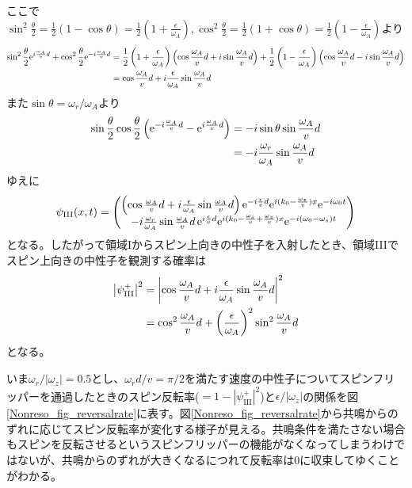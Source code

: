 ここで$\sin^2 \frac{\theta}{2}=\frac{1}{2}(1-\cos \theta) =\frac{1}{2} (1+\frac{\epsilon}{\omega_A}),\cos^2\frac{\theta}{2}=\frac{1}{2} (1+\cos\theta) =\frac{1}{2} (1-\frac{\epsilon}{\omega_A})$より
\begin{align}
\sin^2 \frac{\theta}{2} \mathrm{e}^{i\frac{\omega_A}{v}d} +\cos^2 \frac{\theta}{2} \mathrm{e}^{-i\frac{\omega_A}{v}d} &= \frac{1}{2} \left(1+\frac{\epsilon}{\omega_A}\right) \left(\cos \frac{\omega_A}{v}d+i\sin \frac{\omega_A}{v}d \right)+\frac{1}{2} \left(1-\frac{\epsilon}{\omega_A}\right) \left(\cos \frac{\omega_A}{v}d-i\sin \frac{\omega_A}{v}d \right) \notag \\
&=\cos \frac{\omega_A}{v}d +i\frac{\epsilon}{\omega_A} \sin \frac{\omega_A}{v}d
\end{align}
また$\sin\theta=\omega_r/\omega_A$より
\begin{align}
\sin\frac{\theta}{2}\cos\frac{\theta}{2} \left(\mathrm{e}^{-i\frac{\omega_A}{v}d}-\mathrm{e}^{i\frac{\omega_A}{v}d}\right) &=-i \sin \theta \sin \frac{\omega_A}{v}d \notag \\
&= -i \frac{\omega_r}{\omega_A} \sin \frac{\omega_A}{v}d
\end{align}
ゆえに
\begin{align}
\psi_\mathrm{III}(x,t)=\begin{pmatrix} \left(\cos \frac{\omega_A}{v}d +i\frac{\epsilon}{\omega_A} \sin \frac{\omega_A}{v}d\right) \mathrm{e}^{-i\frac{\epsilon}{v} d} \mathrm{e}^{i(k_0-\frac{\omega_z}{v})x}\mathrm{e}^{-i\omega_0t} \\ -i \frac{\omega_r}{\omega_A} \sin \frac{\omega_A}{v}d  \, \mathrm{e}^{i\frac{\epsilon}{v}d} \mathrm{e}^{i(k_0-\frac{\omega_s}{v}+\frac{\omega_z}{v})x}\mathrm{e}^{-i(\omega_0-\omega_s)t} \end{pmatrix}
\end{align}
となる。したがって領域Iからスピン上向きの中性子を入射したとき、領域IIIでスピン上向きの中性子を観測する確率は
\begin{align}
\bigl|\psi_\mathrm{III}^+\bigr|^2 &=\biggl |\cos \frac{\omega_A}{v}d +i\frac{\epsilon}{\omega_A} \sin \frac{\omega_A}{v}d\biggr|^2 \notag \\
&=\cos^2 \frac{\omega_A}{v}d+\left(\frac{\epsilon}{\omega_A}\right)^2\sin^2\frac{\omega_A}{v}d
\end{align} \label{Nonreso_1-reversal}
となる。

いま$\omega_r/|\omega_z|=0.5$とし、$\omega_r d/v=\pi/2$を満たす速度の中性子についてスピンフリッパーを通過したときのスピン反転率($=1-|\psi_\mathrm{III}^+|^2$)と$\epsilon/|\omega_z|$の関係を図\ref{Nonreso_fig_reversalrate}に表す。図\ref{Nonreso_fig_reversalrate}から共鳴からのずれに応じてスピン反転率が変化する様子が見える。共鳴条件を満たさない場合もスピンを反転させるというスピンフリッパーの機能がなくなってしまうわけではないが、共鳴からのずれが大きくなるにつれて反転率は$0$に収束してゆくことがわかる。

